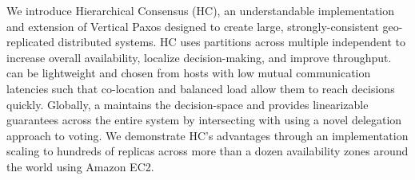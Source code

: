 We introduce Hierarchical Consensus (HC), an understandable implementation
and extension of Vertical Paxos designed to create large,
strongly-consistent geo-replicated distributed systems.
HC uses partitions across multiple independent \subs to increase overall
availability, localize decision-making, and improve throughput.
\Subs can be lightweight and chosen from hosts with low mutual communication
latencies such that co-location and balanced load allow them to reach
decisions quickly.
Globally, a \roo maintains the decision-space and provides linearizable
guarantees across the entire system by intersecting with \subs using a novel
delegation approach to voting.
We demonstrate HC's advantages through an implementation scaling to hundreds
of replicas across more than a dozen availability zones around the world
using Amazon EC2.
